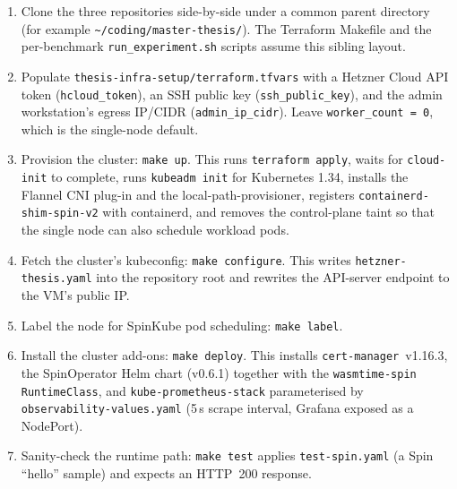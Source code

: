 \begin{enumerate}
    \item \begin{sloppypar}Clone the three repositories side-by-side under a common parent directory (for example \texttt{\textasciitilde/coding/master-thesis/}). The Terraform Makefile and the per-benchmark \texttt{run\_experiment.sh} scripts assume this sibling layout.\end{sloppypar}
    \item \begin{sloppypar}Populate \texttt{thesis-infra-setup/terraform.tfvars} with a Hetzner Cloud API token (\texttt{hcloud\_token}), an \acs{SSH} public key (\texttt{ssh\_public\_key}), and the admin workstation's egress \acs{IP}/CIDR (\texttt{admin\_ip\_cidr}). Leave \texttt{worker\_count = 0}, which is the single-node default.\end{sloppypar}
    \item \begin{sloppypar}Provision the cluster: \texttt{make up}. This runs \texttt{terraform apply}, waits for \texttt{cloud-init} to complete, runs \texttt{kubeadm init} for Kubernetes 1.34, installs the Flannel CNI plug-in and the local-path-provisioner, registers \texttt{containerd-shim-spin-v2} with containerd, and removes the control-plane taint so that the single node can also schedule workload pods.\end{sloppypar}
    \item \begin{sloppypar}Fetch the cluster's kubeconfig: \texttt{make configure}. This writes \texttt{hetzner-thesis.yaml} into the repository root and rewrites the API-server endpoint to the \acs{VM}'s public \acs{IP}.\end{sloppypar}
    \item \begin{sloppypar}Label the node for SpinKube pod scheduling: \texttt{make label}.\end{sloppypar}
    \item \begin{sloppypar}Install the cluster add-ons: \texttt{make deploy}. This installs \texttt{cert-manager}~v1.16.3, the SpinOperator Helm chart (v0.6.1) together with the \texttt{wasmtime-spin} \texttt{RuntimeClass}, and \texttt{kube-prometheus-stack} parameterised by \texttt{observability-values.yaml} (5\,s scrape interval, Grafana exposed as a \acs{NodePort}).\end{sloppypar}
    \item \begin{sloppypar}Sanity-check the runtime path: \texttt{make test} applies \texttt{test-spin.yaml} (a Spin ``hello'' sample) and expects an \acs{HTTP}~200 response.\end{sloppypar}
\end{enumerate}

